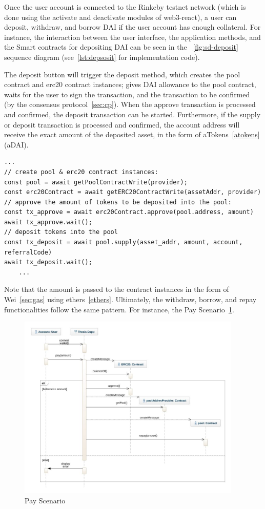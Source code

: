 \documentclass[11pt,a4paper]{report}
\begin{document}
Once the user account is connected to the Rinkeby testnet  network (which is done using the activate and deactivate modules of web3-react), a user can deposit, withdraw, and borrow DAI if the user account has enough collateral. For instance, the interaction between the user interface, the application methods, and the Smart contracts for depositing DAI can be seen in the ~\ref{fig:sd-deposit} sequence diagram (see~\ref{lst:depsosit} for implementation code).

The deposit button will trigger the deposit method, which creates the pool contract and erc20 contract instances; gives DAI allowance to the pool contract, waits for the user to sign the transaction, and the transaction to be confirmed (by the consensus protocol~\ref{sec:cp}). When the approve transaction is processed and confirmed, the deposit transaction can be started. Furthermore, if the supply or deposit transaction is processed and confirmed, the account address will receive the exact amount of the deposited asset, in the form of aTokens~\ref{atokens} (aDAI).
\begin{lstlisting}[frame=single, caption={Deposit Procedure},label={lst:depsosit}]
	...
// create pool & erc20 contract instances:
const pool = await getPoolContractWrite(provider);
const erc20Contract = await getERC20ContractWrite(assetAddr, provider)
// approve the amount of tokens to be deposited into the pool:
const tx_approve = await erc20Contract.approve(pool.address, amount)
await tx_approve.wait();
// deposit tokens into the pool
const tx_deposit = await pool.supply(asset_addr, amount, account, referralCode)
await tx_deposit.wait();
	...
\end{lstlisting}
Note that the amount is passed to the contract instances in the form of Wei~\ref{sec:gas} using ethers~\ref{ethers}. Ultimately, the withdraw, borrow, and repay functionalities follow the same pattern. For instance, the Pay Scenario~\ref{fig:sd-pay}.
\begin{figure}[htp]
	\centering
	\includegraphics[width=0.95\textwidth]{./images/sequence-repay}
	\caption{Pay Scenario}
	\label{fig:sd-pay}
\end{figure}
\end{document}
